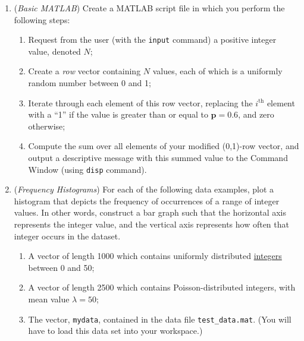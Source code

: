 \documentclass[11pt]{../src/nps-homework}
\begin{document}
\begin{enumerate}

	\item \label{hw:basicMatlab} (\textit{Basic MATLAB}) Create a MATLAB script file in which you perform the following steps:
		\begin{enumerate}
			\item Request from the user (with the \texttt{input} command) a positive integer value, denoted $N$;
			\item Create a \textit{row} vector containing $N$ values, each of which is a uniformly random number between 0 and 1;
			\item Iterate through each element of this row vector, replacing the $i^\text{th}$ element with a ``1'' if the value is greater than or equal to $\bm{p=0.6}$, and zero otherwise;
			\item Compute the sum over all elements of your modified (0,1)-row vector, and output a descriptive message with this summed value to the Command Window (using \texttt{disp} command).
		\end{enumerate}			

		


    \vspace{0.25cm}

	\item \label{hw:freqHist} (\textit{Frequency Histograms}) For each of the following data examples, plot a histogram that depicts the frequency of occurrences of a range of integer values. In other words, construct a bar graph such that the horizontal axis represents the integer value, and the vertical axis represents how often that integer occurs in the dataset.
		\begin{enumerate}
			\item A vector of length 1000 which contains uniformly distributed \underline{integers} between 0 and 50;
			\item A vector of length 2500 which contains Poisson-distributed integers, with mean value $\lambda = 50$;
			\item The vector, \texttt{mydata}, contained in the data file \texttt{test\_data.mat}. (You will have to load this data set into your workspace.)
			

\end{enumerate}
\end{enumerate}
\end{document}
